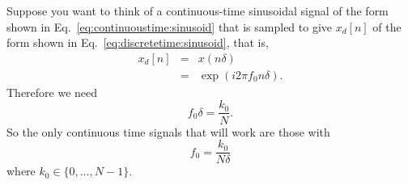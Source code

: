 \documentclass{article}
\begin{document}
\par
Suppose you want to think of a continuous-time sinusoidal signal of the
form shown in Eq.~\ref{eq:continuoustime:sinusoid} that is sampled to give
$x_d[n]$ of the form shown in Eq.~\ref{eq:discretetime:sinusoid}, that is,
\begin{eqnarray}
x_d[n]
&=&
x(n\delta)
\\
&=&
\exp(i2\pi f_0 n\delta)
.
\end{eqnarray}
Therefore we need
\begin{equation}
f_0 \delta
=
\frac{k_0}{N}
.
\end{equation}
So the only continuous time signals that will work are those with
\begin{equation}
f_0
=
\frac{k_0}{N\delta}
\end{equation}
where $k_0\in\{0,\dots,N-1\}$.
\end{document}
